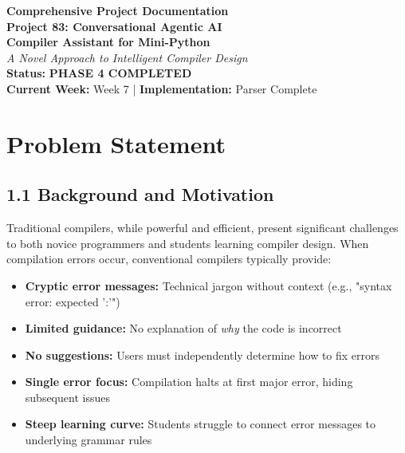 \documentclass[a4paper,11pt]{article}
\newcommand{\statusgood}[1]{\colorbox{green!20}{\textbf{#1}}}
\begin{document}
\begin{center}
    {\Huge \textbf{Comprehensive Project Documentation}} \\
    \vspace{5mm}
    {\LARGE \textbf{Project 83: Conversational Agentic AI}} \\
    {\LARGE \textbf{Compiler Assistant for Mini-Python}} \\
    \vspace{3mm}
    {\large \textit{A Novel Approach to Intelligent Compiler Design}} \\
    \vspace{3mm}
    \textbf{Status:} \statusgood{PHASE 4 COMPLETED} \\
    \textbf{Current Week:} Week 7 | \textbf{Implementation:} Parser Complete
\end{center}

\vspace{5mm}

\tableofcontents
\clearpage

\section{Problem Statement}

\subsection{1.1 Background and Motivation}

Traditional compilers, while powerful and efficient, present significant challenges to both novice programmers and students learning compiler design. When compilation errors occur, conventional compilers typically provide:

\begin{itemize}[leftmargin=*]
    \item \textbf{Cryptic error messages:} Technical jargon without context (e.g., "syntax error: expected ':'")
    \item \textbf{Limited guidance:} No explanation of \textit{why} the code is incorrect
    \item \textbf{No suggestions:} Users must independently determine how to fix errors
    \item \textbf{Single error focus:} Compilation halts at first major error, hiding subsequent issues
    \item \textbf{Steep learning curve:} Students struggle to connect error messages to underlying grammar rules
\end{itemize}
\end{document}
